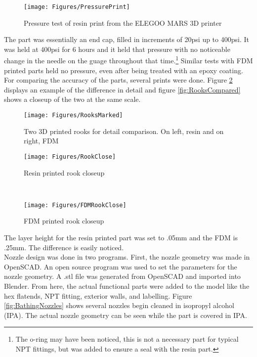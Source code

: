 \begin{figure}[h!]
\centering
\texttt{[image: Figures/PressurePrint]}
\caption{Pressure test of resin print from the ELEGOO MARS 3D printer}
\label{fig:PressurePrint}
\end{figure}
The part was essentially an end cap, filled in increments of 20psi up to 400psi. It was held at 400psi for 6 hours and it held that pressure with no noticeable change in the needle on the guage throughout that time.\footnote{The o-ring may have been noticed, this is not a necessary part for typical NPT fittings, but was added to ensure a seal with the resin part.} Similar tests with FDM printed parts held no pressure, even after being treated with an epoxy coating. For comparing the accuracy of the parts, several prints were done. Figure \ref{fig:Rooks} displays an example of the difference in detail and figure \ref{fig:RooksCompared} shows a closeup of the two at the same scale.\clearpage
\begin{figure}[h!]
\centering
\texttt{[image: Figures/RooksMarked]}
\caption{Two 3D printed rooks for detail comparison. On left, resin and on right, FDM}
\label{fig:Rooks}
\end{figure}
\begin{figure*}[h!]
    \centering
    \begin{subfigure}[t]{0.5\textwidth}
        \centering
        \texttt{[image: Figures/RookClose]}
        \caption{Resin printed rook closeup}
    \end{subfigure}%
    ~ 
    \begin{subfigure}[t]{0.5\textwidth}
        \centering
        \texttt{[image: Figures/FDMRookClose]}
        \caption{FDM printed rook closeup}
    \end{subfigure}
    \caption{Rook closeups}
\label{fig:RooksCompared}
\end{figure*}
The layer height for the resin printed part was set to .05mm and the FDM is .25mm. The difference is easily noticed.\\
Nozzle design was done in two programs. First, the nozzle geometry was made in OpenSCAD. An open source program was used to set the parameters for the nozzle geometry. A .stl file was generated from OpenSCAD and imported into Blender. From here, the actual functional parts were added to the model like the hex flatends, NPT fitting, exterior walls, and labelling. Figure \ref{fig:BathingNozzles} shows several nozzles begin cleaned in isopropyl alcohol (IPA). The actual nozzle geometry can be seen while the part is covered in IPA.
